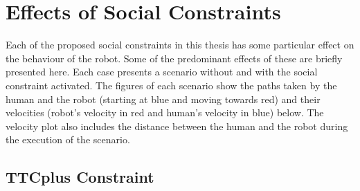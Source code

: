 \chapter{Effects of Social Constraints}
Each of the proposed social constraints in this thesis has some particular effect on the behaviour of the robot. Some of the predominant effects of these are briefly presented here. Each case presents a scenario without and with the social constraint activated. The figures of each scenario show the paths taken by the human and the robot (starting at blue and moving towards red) and their velocities (robot's velocity in red and human's velocity in blue) below. The velocity plot also includes the distance between the human and the robot during the execution of the scenario. 

\section{TTCplus Constraint}
